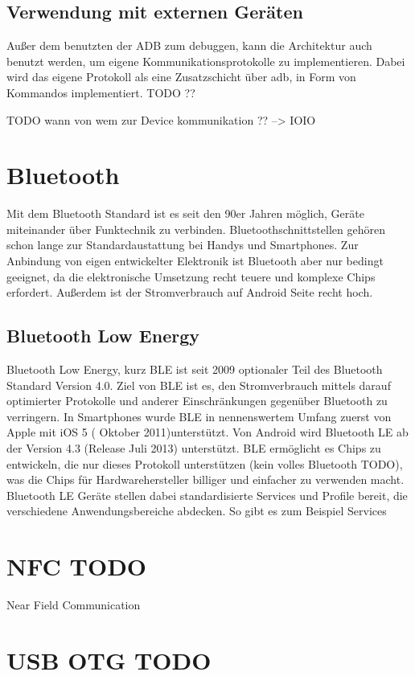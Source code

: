 \documentclass[12pt,journal,compsoc]{IEEEtran}
\begin{document}
\subsection{Verwendung mit externen Geräten}
Außer dem benutzten der ADB zum debuggen, kann die Architektur auch benutzt werden, um eigene Kommunikationsprotokolle zu implementieren.
Dabei wird das eigene Protokoll als eine Zusatzschicht über adb, in Form von Kommandos implementiert. TODO ??


TODO wann von wem zur Device kommunikation ?? --> IOIO

\section{Bluetooth}
Mit dem Bluetooth Standard ist es seit den 90er Jahren möglich, Geräte miteinander über Funktechnik zu verbinden. Bluetoothschnittstellen gehören schon lange zur Standardaustattung bei Handys und Smartphones.
Zur Anbindung von eigen entwickelter Elektronik ist Bluetooth aber nur bedingt geeignet, da die elektronische Umsetzung recht teuere und komplexe Chips erfordert. Außerdem ist der Stromverbrauch auf Android Seite recht hoch.
\subsection{Bluetooth Low Energy}
Bluetooth Low Energy, kurz BLE ist seit 2009 optionaler Teil des Bluetooth Standard Version 4.0. 
Ziel von BLE ist es, den Stromverbrauch mittels darauf optimierter Protokolle und anderer Einschränkungen gegenüber Bluetooth zu verringern.
In Smartphones wurde BLE in nennenswertem Umfang zuerst von Apple mit iOS 5 ( Oktober 2011)unterstützt.
Von Android wird Bluetooth LE ab der Version 4.3 (Release Juli 2013) unterstützt.
BLE ermöglicht es Chips zu entwickeln, die nur dieses Protokoll unterstützen (kein volles Bluetooth TODO), was die Chips für Hardwarehersteller billiger und einfacher zu verwenden macht.
Bluetooth LE Geräte stellen dabei standardisierte Services und Profile bereit, die verschiedene Anwendungsbereiche abdecken.
So gibt es zum Beispiel Services  
\cite{bluetooth}

\section{NFC TODO}
Near Field Communication 



\section{USB OTG TODO}
\end{document}
